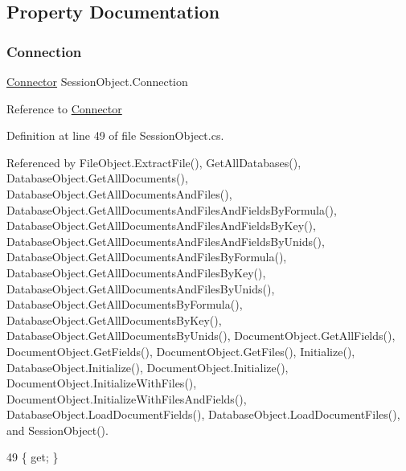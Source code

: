 \subsection{Property Documentation}
\mbox{\label{class_session_object_a014bdbf705a753540e19bfb53030c55c}} 
\subsubsection{\texorpdfstring{Connection}{Connection}}
{\footnotesize\ttfamily \mbox{\hyperlink{class_connector}{Connector}} Session\+Object.\+Connection\hspace{0.3cm}{\ttfamily [get]}}



Reference to \mbox{\hyperlink{class_connector}{Connector}} 



Definition at line 49 of file Session\+Object.\+cs.



Referenced by File\+Object.\+Extract\+File(), Get\+All\+Databases(), Database\+Object.\+Get\+All\+Documents(), Database\+Object.\+Get\+All\+Documents\+And\+Files(), Database\+Object.\+Get\+All\+Documents\+And\+Files\+And\+Fields\+By\+Formula(), Database\+Object.\+Get\+All\+Documents\+And\+Files\+And\+Fields\+By\+Key(), Database\+Object.\+Get\+All\+Documents\+And\+Files\+And\+Fields\+By\+Unids(), Database\+Object.\+Get\+All\+Documents\+And\+Files\+By\+Formula(), Database\+Object.\+Get\+All\+Documents\+And\+Files\+By\+Key(), Database\+Object.\+Get\+All\+Documents\+And\+Files\+By\+Unids(), Database\+Object.\+Get\+All\+Documents\+By\+Formula(), Database\+Object.\+Get\+All\+Documents\+By\+Key(), Database\+Object.\+Get\+All\+Documents\+By\+Unids(), Document\+Object.\+Get\+All\+Fields(), Document\+Object.\+Get\+Fields(), Document\+Object.\+Get\+Files(), Initialize(), Database\+Object.\+Initialize(), Document\+Object.\+Initialize(), Document\+Object.\+Initialize\+With\+Files(), Document\+Object.\+Initialize\+With\+Files\+And\+Fields(), Database\+Object.\+Load\+Document\+Fields(), Database\+Object.\+Load\+Document\+Files(), and Session\+Object().


\begin{DoxyCode}
49 \{ \textcolor{keyword}{get}; \}
\end{DoxyCode}
\mbox{\label{class_session_object_aa0b75f5b9d0a6325f436e08db27204a2}} 
